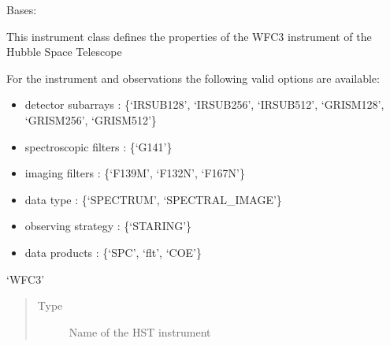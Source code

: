 \documentclass[a4paper,10pt,english]{sphinxmanual}
\begin{document}

\begin{fulllineitems}
\label{\detokenize{cascade.instruments:cascade.instruments.instruments.HSTWFC3}}
Bases: {\hyperref[\detokenize{cascade.instruments:cascade.instruments.instruments.InstrumentBase}]{}}

This instrument class defines the properties of the WFC3 instrument of
the Hubble Space Telescope

For the instrument and observations the following valid options are
available:
\begin{itemize}
\item {} 
detector subarrays : \{‘IRSUB128’, ‘IRSUB256’, ‘IRSUB512’, ‘GRISM128’,
‘GRISM256’, ‘GRISM512’\}

\item {} 
spectroscopic filters : \{‘G141’\}

\item {} 
imaging filters :  \{‘F139M’, ‘F132N’, ‘F167N’\}

\item {} 
data type : \{‘SPECTRUM’, ‘SPECTRAL\_IMAGE’\}

\item {} 
observing strategy : \{‘STARING’\}

\item {} 
data products : \{‘SPC’, ‘flt’, ‘COE’\}

\end{itemize}

\begin{fulllineitems}
\label{\detokenize{cascade.instruments:cascade.instruments.instruments.HSTWFC3.name}}
‘WFC3’
\begin{quote}\begin{description}
\item[{Type}] \leavevmode
Name of the HST instrument

\end{description}\end{quote}

\end{fulllineitems}


\end{fulllineitems}
\end{document}
